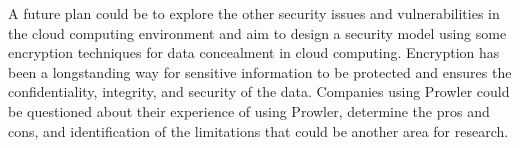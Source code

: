 \par A future plan could be to explore the other security issues and vulnerabilities in the cloud computing environment and aim to design a security model using some encryption techniques for data concealment in cloud computing. Encryption has been a longstanding way for sensitive information to be protected and ensures the confidentiality, integrity, and security of the data. Companies using Prowler could be questioned about their experience of using Prowler, determine the pros and cons, and identification of the limitations that could be another area for research.